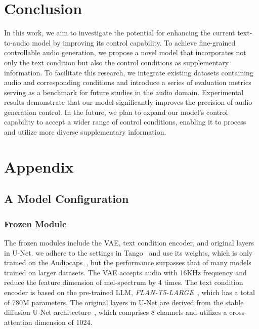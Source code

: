 \documentclass[letterpaper]{article} %
\begin{document}
\section{Conclusion}

In this work, we aim to investigate the potential for enhancing the current text-to-audio model by improving its control capability. To achieve fine-grained controllable audio generation, we propose a novel model that incorporates not only the text condition but also the control conditions as supplementary information. To facilitate this research, we integrate existing datasets containing audio and corresponding conditions and introduce a series of evaluation metrics serving as a benchmark for future studies in the audio domain. Experimental results demonstrate that our model significantly improves the precision of audio generation control. In the future, we plan to expand our model's control capability to accept a wider range of control conditions, enabling it to process and utilize more diverse supplementary information.


\section{Appendix}

\subsection{A Model Configuration}

\subsubsection{Frozen Module} The frozen modules include the VAE, text condition encoder, and original layers in U-Net. we adhere to the settings in Tango~\cite{ghosal2023tango} and use its weights, which is only trained on the Audiocaps~\cite{kim2019audiocaps}, but the performance surpasses that of many models trained on larger datasets. The VAE accepts audio with 16KHz
frequency and reduce the feature dimension of mel-spectrum by 4 times. The text condition encoder is based on the pre-trained LLM, \textit{FLAN-T5-LARGE}~\cite{chung2022siflm}, which has a total of 780M parameters. The original layers in U-Net are derived from the stable diffusion U-Net architecture~\cite{ronneberger2015unet,rombach2021highresolution}, which comprises 8 channels and utilizes a cross-attention dimension of 1024.
\end{document}
